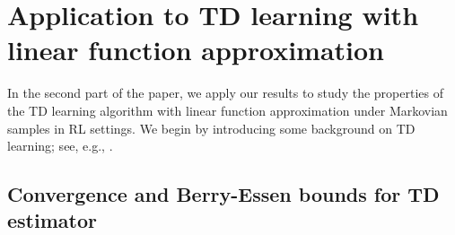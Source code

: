 \section{Application to TD learning with linear function approximation}\label{sec:TD}

In the second part of the paper, we apply our results to study the properties of the TD learning algorithm with linear function approximation under Markovian samples in RL settings. 
We begin by introducing some background on TD learning; see, e.g., \cite{sutton2018reinforcement}.





\subsection{Convergence and Berry-Essen bounds for TD estimator}


